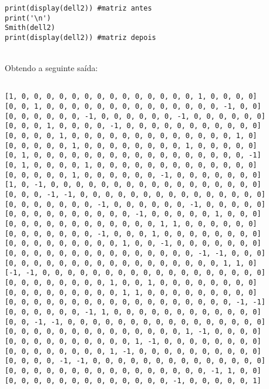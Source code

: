 \documentclass[12pt,a4paper]{article}
\theoremstyle{definition}
\begin{document}
\begin{lstlisting}[language=iPython]
print(display(dell2)) #matriz antes
print('\n')
Smith(dell2)
print(display(dell2)) #matriz depois
\end{lstlisting}\ \\

Obtendo a seguinte saída:

\begin{lstlisting}[language=iPython]
 
[1, 0, 0, 0, 0, 0, 0, 0, 0, 0, 0, 0, 0, 0, 0, 1, 0, 0, 0, 0]
[0, 0, 1, 0, 0, 0, 0, 0, 0, 0, 0, 0, 0, 0, 0, 0, 0, -1, 0, 0]
[0, 0, 0, 0, 0, 0, -1, 0, 0, 0, 0, 0, 0, -1, 0, 0, 0, 0, 0, 0]
[0, 0, 0, 1, 0, 0, 0, 0, -1, 0, 0, 0, 0, 0, 0, 0, 0, 0, 0, 0]
[0, 0, 0, 0, 1, 0, 0, 0, 0, 0, 0, 0, 0, 0, 0, 0, 0, 0, 1, 0]
[0, 0, 0, 0, 0, 1, 0, 0, 0, 0, 0, 0, 0, 0, 1, 0, 0, 0, 0, 0]
[0, 1, 0, 0, 0, 0, 0, 0, 0, 0, 0, 0, 0, 0, 0, 0, 0, 0, 0, -1]
[0, 1, 0, 0, 0, 0, 1, 0, 0, 0, 0, 0, 0, 0, 0, 0, 0, 0, 0, 0]
[0, 0, 0, 0, 0, 1, 0, 0, 0, 0, 0, 0, -1, 0, 0, 0, 0, 0, 0, 0]
[1, 0, -1, 0, 0, 0, 0, 0, 0, 0, 0, 0, 0, 0, 0, 0, 0, 0, 0, 0]
[0, 0, 0, -1, -1, 0, 0, 0, 0, 0, 0, 0, 0, 0, 0, 0, 0, 0, 0, 0]
[0, 0, 0, 0, 0, 0, 0, -1, 0, 0, 0, 0, 0, 0, -1, 0, 0, 0, 0, 0]
[0, 0, 0, 0, 0, 0, 0, 0, 0, 0, -1, 0, 0, 0, 0, 0, 1, 0, 0, 0]
[0, 0, 0, 0, 0, 0, 0, 0, 0, 0, 0, 0, 1, 1, 0, 0, 0, 0, 0, 0]
[0, 0, 0, 0, 0, 0, 0, -1, 0, 0, 0, 1, 0, 0, 0, 0, 0, 0, 0, 0]
[0, 0, 0, 0, 0, 0, 0, 0, 0, 1, 0, 0, -1, 0, 0, 0, 0, 0, 0, 0]
[0, 0, 0, 0, 0, 0, 0, 0, 0, 0, 0, 0, 0, 0, 0, -1, -1, 0, 0, 0]
[0, 0, 0, 0, 0, 0, 0, 0, 0, 0, 0, 0, 0, 0, 0, 0, 0, 1, 1, 0]
[-1, -1, 0, 0, 0, 0, 0, 0, 0, 0, 0, 0, 0, 0, 0, 0, 0, 0, 0, 0]
[0, 0, 0, 0, 0, 0, 0, 0, 1, 0, 0, 1, 0, 0, 0, 0, 0, 0, 0, 0]
[0, 0, 0, 0, 0, 0, 0, 0, 0, 1, 1, 0, 0, 0, 0, 0, 0, 0, 0, 0]
[0, 0, 0, 0, 0, 0, 0, 0, 0, 0, 0, 0, 0, 0, 0, 0, 0, 0, -1, -1]
[0, 0, 0, 0, 0, 0, -1, 1, 0, 0, 0, 0, 0, 0, 0, 0, 0, 0, 0, 0]
[0, 0, -1, -1, 0, 0, 0, 0, 0, 0, 0, 0, 0, 0, 0, 0, 0, 0, 0, 0]
[0, 0, 0, 0, 0, 0, 0, 0, 0, 0, 0, 0, 0, 0, 1, -1, 0, 0, 0, 0]
[0, 0, 0, 0, 0, 0, 0, 0, 0, 0, 1, -1, 0, 0, 0, 0, 0, 0, 0, 0]
[0, 0, 0, 0, 0, 0, 0, 0, 1, -1, 0, 0, 0, 0, 0, 0, 0, 0, 0, 0]
[0, 0, 0, 0, -1, -1, 0, 0, 0, 0, 0, 0, 0, 0, 0, 0, 0, 0, 0, 0]
[0, 0, 0, 0, 0, 0, 0, 0, 0, 0, 0, 0, 0, 0, 0, 0, -1, 1, 0, 0]
[0, 0, 0, 0, 0, 0, 0, 0, 0, 0, 0, 0, 0, -1, 0, 0, 0, 0, 0, 1]




\end{lstlisting}
\end{document}
